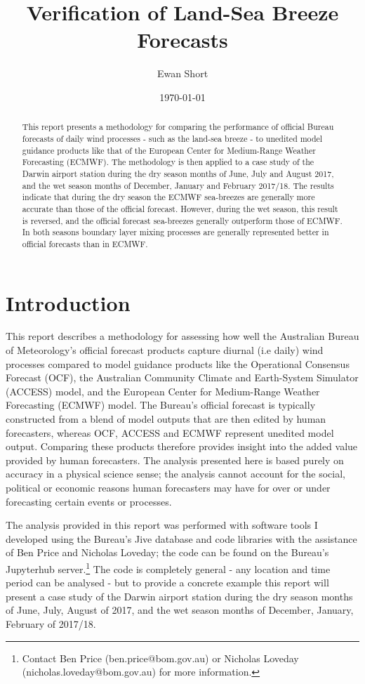 \documentclass[12pt]{article}
\title{Verification of Land-Sea Breeze Forecasts}
\author{Ewan Short}
\date{\today}
\begin{document}
\maketitle

\begin{abstract}
\noindent This report presents a methodology for comparing the performance of official Bureau forecasts of daily wind processes - such as the land-sea breeze - to unedited model guidance products like that of the European Center for Medium-Range Weather Forecasting (ECMWF). The methodology is then applied to a case study of the Darwin airport station during the dry season months of June, July and August 2017, and the wet season months of December, January and February 2017/18. The results indicate that during the dry season the ECMWF sea-breezes are generally more accurate than those of the official forecast. However, during the wet season, this result is reversed, and the official forecast sea-breezes generally outperform those of ECMWF. In both seasons boundary layer mixing processes are generally represented better in official forecasts than in ECMWF.  
\end{abstract}

\clearpage

\section{Introduction}\label{introduction}
This report describes a methodology for assessing how well the Australian Bureau of Meteorology's official forecast products capture diurnal (i.e daily) wind processes compared to model guidance products like the Operational Consensus Forecast (OCF), the Australian Community Climate and Earth-System Simulator (ACCESS) model, and the European Center for Medium-Range Weather Forecasting (ECMWF) model. The Bureau's official forecast is typically constructed from a blend of model outputs that are then edited by human forecasters, whereas OCF, ACCESS and ECMWF represent unedited model output. Comparing these products therefore provides insight into the added value provided by human forecasters. The analysis presented here is based purely on accuracy in a physical science sense; the analysis cannot account for the social, political or economic reasons human forecasters may have for over or under forecasting certain events or processes.

The analysis provided in this report was performed with software tools I developed using the Bureau's Jive database and code libraries with the assistance of Ben Price and Nicholas Loveday; the code can be found on the Bureau's Jupyterhub server.\footnote{Contact Ben Price (ben.price@bom.gov.au) or Nicholas Loveday (nicholas.loveday@bom.gov.au) for more information.} The code is completely general - any location and time period can be analysed - but to provide a concrete example this report will present a case study of the Darwin airport station during the dry season months of June, July, August of 2017, and the wet season months of December, January, February of 2017/18. 
\end{document}
